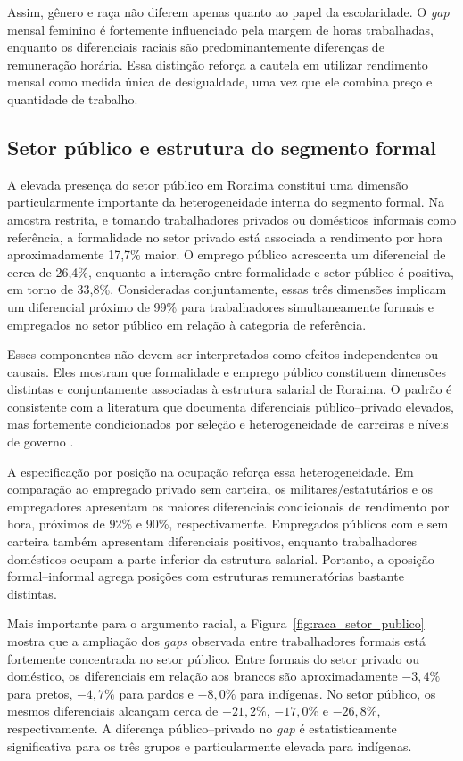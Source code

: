 \documentclass[12pt]{article}
\begin{document}
Assim, gênero e raça não diferem apenas quanto ao papel da escolaridade. O \textit{gap}
mensal feminino é fortemente influenciado pela margem de horas trabalhadas,
enquanto os diferenciais raciais são predominantemente diferenças de
remuneração horária. Essa distinção reforça a cautela em utilizar rendimento
mensal como medida única de desigualdade, uma vez que ele combina preço e
quantidade de trabalho.

\subsection{Setor público e estrutura do segmento formal}
\label{subsec:setor_publico}

A elevada presença do setor público em Roraima constitui uma dimensão
particularmente importante da heterogeneidade interna do segmento formal.
Na amostra restrita, e tomando trabalhadores privados ou domésticos informais
como referência, a formalidade no setor privado está associada a rendimento por
hora aproximadamente 17,7\% maior. O emprego público acrescenta um diferencial
de cerca de 26,4\%, enquanto a interação entre formalidade e setor público é
positiva, em torno de 33,8\%. Consideradas conjuntamente, essas três dimensões
implicam um diferencial próximo de 99\% para trabalhadores simultaneamente
formais e empregados no setor público em relação à categoria de referência.

Esses componentes não devem ser interpretados como efeitos independentes ou
causais. Eles mostram que formalidade e emprego público constituem dimensões
distintas e conjuntamente associadas à estrutura salarial de Roraima. O padrão
é consistente com a literatura que documenta diferenciais público--privado
elevados, mas fortemente condicionados por seleção e heterogeneidade de
carreiras e níveis de governo \citep{foguel2000, moriconi2009,
mattos2022, baez2021}.

A especificação por posição na ocupação reforça essa heterogeneidade. Em
comparação ao empregado privado sem carteira, os militares/estatutários e os
empregadores apresentam os maiores diferenciais condicionais de rendimento por
hora, próximos de 92\% e 90\%, respectivamente. Empregados públicos com e sem
carteira também apresentam diferenciais positivos, enquanto trabalhadores
domésticos ocupam a parte inferior da estrutura salarial. Portanto, a oposição
formal--informal agrega posições com estruturas remuneratórias bastante
distintas.

Mais importante para o argumento racial, a Figura~\ref{fig:raca_setor_publico}
mostra que a ampliação dos \textit{gaps} observada entre trabalhadores formais está
fortemente concentrada no setor público. Entre formais do setor privado ou
doméstico, os diferenciais em relação aos brancos são aproximadamente $-3,4\%$
para pretos, $-4,7\%$ para pardos e $-8,0\%$ para indígenas. No setor público,
os mesmos diferenciais alcançam cerca de $-21,2\%$, $-17,0\%$ e $-26,8\%$,
respectivamente. A diferença público--privado no \textit{gap} é estatisticamente
significativa para os três grupos e particularmente elevada para indígenas.
\end{document}
